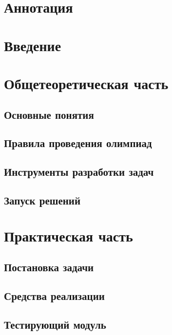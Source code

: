 



\chapter*{Аннотация}


\renewcommand{\contentsname}{Содержание}
\tableofcontents

\chapter*{Введение}


\chapter{Общетеоретическая часть}
\section{Основные понятия}

\section{Правила проведения олимпиад}

\section{Инструменты разработки задач}

\section{Запуск решений}


\chapter{Практическая часть}
\section{Постановка задачи}

\section{Средства реализации}

\section{Тестирующий модуль}

